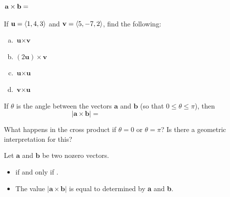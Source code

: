 \documentclass[notes]{subfiles}
\begin{document}
		\begin{rmk}
			
			\[\textbf{a}\times \textbf{b} = \hspace{4.5in}\]
		\end{rmk}
			
		\begin{ex}
			If $\textbf{u} = \left\langle 1,4,3\right\rangle$ and $\textbf{v} = \left\langle 5,-7,2\right\rangle$, find the following:
			\begin{enumerate}[(a)]
				\item $\textbf{u}\times \textbf{v}$
					
				\item $(2\textbf{u})\times \textbf{v}$
					
				\item $\textbf{u}\times \textbf{u}$
					
				\item $\textbf{v}\times \textbf{u}$	
			\end{enumerate}
		\end{ex}
			\newpage
			
		\begin{defn}
			If $\theta$ is the angle between the vectors $\textbf{a}$ and $\textbf{b}$ (so that $0\leq \theta\leq \pi$), then\\[15pt]
				\[|\textbf{a}\times \textbf{b}| =\hspace{2in}\]
		\end{defn}
		
		\begin{question}
			What happens in the cross product if $\theta = 0$ or $\theta = \pi$?  Is there a geometric interpretation for this?
		\end{question}
			
		\begin{rmk}
			Let $\textbf{a}$ and $\textbf{b}$ be two nozero vectors.\\[15pt]
			\begin{itemize}
			\setlength\itemsep{15pt}
				\item {} if and only if .
				\item The value $|\textbf{a}\times\textbf{b}|$ is equal to  determined by \textbf{a} and \textbf{b}.
			\end{itemize}
		\end{rmk}
		
\end{document}
